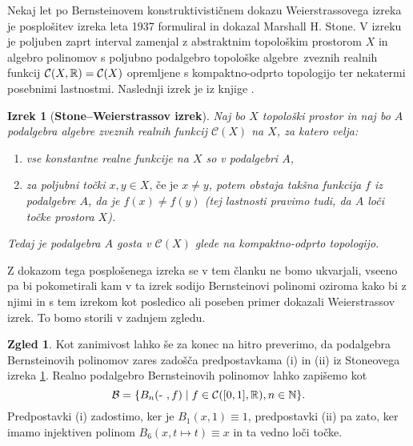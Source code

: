 \documentclass[a4paper, reqno]{amsart}
\theoremstyle{theorem}
\newtheorem{izrek}{Izrek}[section]
\theoremstyle{definition}
\newtheorem*{zgled*}{Zgled}
\begin{document}
\par
Nekaj let po Bernsteinovem konstruktivističnem dokazu Weierstrassovega
izreka je posplošitev izreka leta 1937 formuliral in dokazal
Marshall H. Stone. V izreku je poljuben zaprt interval zamenjal z abstraktnim
topološkim prostorom $X$ in algebro polinomov s poljubno podalgebro
topološke algebre zveznih realnih funkcij $\mathcal{C}(X, \mathbb{R}) = \mathcal{C}(X)$
opremljene s
kompaktno-odprto topologijo ter nekatermi posebnimi lastnostmi.
Naslednji izrek je iz knjige \cite[Izrek 4.28]{MrcunTop}.

\renewcommand{\labelenumi}{(\roman{enumi})}

\begin{izrek}[\textbf{Stone--Weierstrassov izrek}]
	\label{Stone}
	Naj bo $X$ topološki prostor in naj bo $A$ podalgebra algebre zveznih
	realnih funkcij $\mathcal{C}(X)$ na $X$, za katero velja:
	\begin{enumerate}
		\item vse konstantne realne funkcije na $X$ so v podalgebri $A$,
		\item za poljubni točki $x, y \in X\text{, če je } x \neq y$, potem obstaja takšna
		funkcija $f$ iz podalgebre $A$, da je $f(x) \neq f(y)$ (tej
		lastnosti pravimo tudi, da $A$ loči točke prostora $X$). 
	\end{enumerate}
	Tedaj je podalgebra $A$ gosta v $\mathcal{C}(X)$ glede na kompaktno-odprto
	topologijo. 
\end{izrek}

\par
Z dokazom tega posplošenega izreka se v tem članku ne bomo ukvarjali, vseeno
pa bi pokometirali kam v ta izrek sodijo Bernsteinovi polinomi oziroma kako
bi z njimi in s tem izrekom kot posledico ali poseben primer dokazali 
Weierstrassov izrek. To bomo storili v zadnjem zgledu.

\begin{zgled*}
	Kot zanimivost lahko še za konec na hitro preverimo, da podalgebra Bernsteinovih
	polinomov zares zadošča predpostavkama (i) in (ii) iz Stoneovega izreka 
	\ref{Stone}. Realno podalgebro Bernsteinovih polinomov lahko zapišemo kot
	$$
	\mathcal{B} = \{B_n(\text{- }, f) \mid f \in \mathcal{C}([0,1],\mathbb{R}), n \in \mathbb{N}\}\text{.}
	$$
	Predpostavki (i) zadostimo, ker je $B_1(x, 1) \equiv 1$, predpostavki (ii) pa zato,
	ker imamo injektiven polinom $B_6(x, t \mapsto t) \equiv x$ in ta vedno loči točke.
\end{zgled*}

\end{document}
